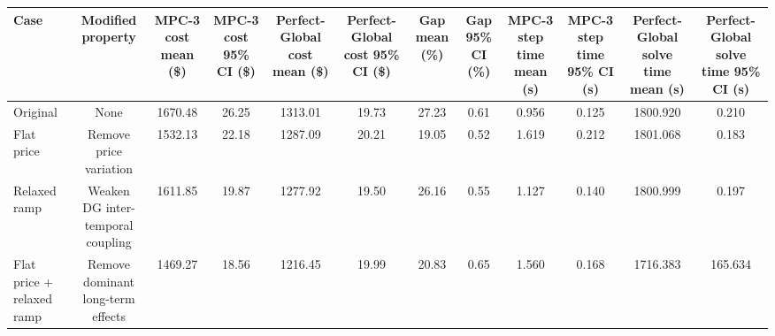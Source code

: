 \begin{tabular}{lccccccccccc}
\toprule
Case & Modified property & MPC-3 cost mean (\$) & MPC-3 cost 95\% CI (\$) & Perfect-Global cost mean (\$) & Perfect-Global cost 95\% CI (\$) & Gap mean (\%) & Gap 95\% CI (\%) & MPC-3 step time mean (s) & MPC-3 step time 95\% CI (s) & Perfect-Global solve time mean (s) & Perfect-Global solve time 95\% CI (s) \\
\midrule
Original & None & 1670.48 & 26.25 & 1313.01 & 19.73 & 27.23 & 0.61 & 0.956 & 0.125 & 1800.920 & 0.210 \\
Flat price & Remove price variation & 1532.13 & 22.18 & 1287.09 & 20.21 & 19.05 & 0.52 & 1.619 & 0.212 & 1801.068 & 0.183 \\
Relaxed ramp & Weaken DG inter-temporal coupling & 1611.85 & 19.87 & 1277.92 & 19.50 & 26.16 & 0.55 & 1.127 & 0.140 & 1800.999 & 0.197 \\
Flat price + relaxed ramp & Remove dominant long-term effects & 1469.27 & 18.56 & 1216.45 & 19.99 & 20.83 & 0.65 & 1.560 & 0.168 & 1716.383 & 165.634 \\
\bottomrule
\end{tabular}
